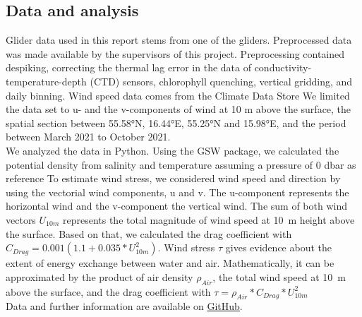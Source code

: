 \documentclass[../Main.tex]{subfiles}
\begin{document}
\subsection*{\crule[blue]{.2cm}{.2cm} Data and analysis}
Glider data used in this report stems from one of the gliders. 
Preprocessed data was made available by the supervisors of this project. 
Preprocessing contained despiking, correcting the thermal lag error in the data of conductivity-temperature-depth (CTD) sensors, chlorophyll quenching, vertical gridding, and daily binning. 
Wind speed data comes from the Climate Data Store%
We limited the data set to u- and the v-components of wind at 10 m above the surface, the spatial section between 55.58°N, 16.44°E, 55.25°N and 15.98°E, and the period between March 2021 to October 2021.
\\
We analyzed the data in Python. Using the GSW package, we calculated the potential density from salinity and temperature assuming a pressure of 0 dbar as reference%
To estimate wind stress, we considered wind speed and direction by using the vectorial wind components, u and v.
The u-component represents the horizontal wind and the v-component the vertical wind. 
The sum of both wind vectors $U_{10m}$ represents the total magnitude of wind speed at \SI{10}{m} height above the surface. Based on that, we calculated the drag coefficient with $C_{Drag} = 0.001(1.1+0.035*U_{10m}^2)$. 
Wind stress $\tau$ gives evidence about the extent of energy exchange between water and air.
Mathematically, it can be approximated by the product of air density $\rho_{Air}$, the total wind speed at \SI{10}{m} above the surface, and the drag coefficient with $\tau = \rho_{Air}*C_{Drag}*U_{10m}^2$%
\\
Data and further information are available on \href{https://github.com/joaldi2208/BloomDynamics}{GitHub}.
\end{document}
